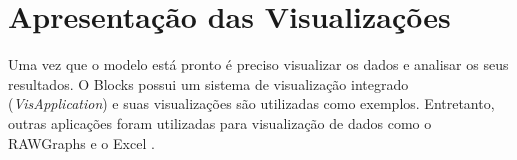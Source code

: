\documentclass[
	12pt,				%
	openright,			%
	oneside,			%
	a4paper,			%
	english,			%
	brazil				%
	]{abntex2}
\begin{document}

		
	\section{Apresentação das Visualizações}
	Uma vez que o modelo está pronto é preciso visualizar os dados e analisar os seus resultados.
	O Blocks possui um sistema de visualização integrado (\emph{VisApplication}) e suas visualizações são utilizadas como exemplos.
	Entretanto, outras aplicações foram utilizadas para visualização de dados como o RAWGraphs \cite{rawGraphs} e o Excel \cite{excel}.
	\par
\end{document}
